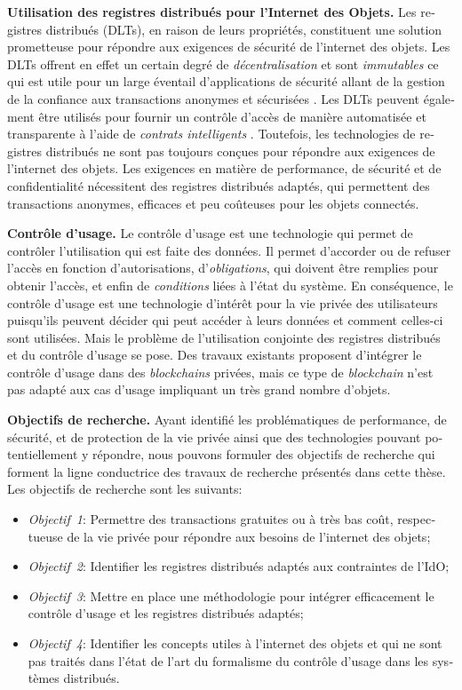 \begin{otherlanguage}{french}
\textbf{Utilisation des registres distribués pour l'Internet des Objets.} Les registres distribués (DLTs), en raison de leurs propriétés, constituent une solution prometteuse pour répondre aux exigences de sécurité de l'internet des objets. Les DLTs offrent en effet un certain degré de \emph{décentralisation} et sont \emph{immutables} ce qui est utile pour un large éventail d'applications de sécurité allant de la gestion de la confiance \cite{Liu2023} aux transactions anonymes et sécurisées \cite{Bothra2023}. Les DLTs peuvent également être utilisés pour fournir un contrôle d'accès de manière automatisée et transparente à l'aide de \emph{contrats intelligents} \cite{Bao2023}. Toutefois, les technologies de registres distribués ne sont pas toujours conçues pour répondre aux exigences de l'internet des objets. Les exigences en matière de performance, de sécurité et de confidentialité nécessitent des registres distribués adaptés, qui permettent des transactions anonymes, efficaces et peu coûteuses pour les objets connectés.

\textbf{Contrôle d'usage.} Le contrôle d'usage est une technologie qui permet de contrôler l'utilisation qui est faite des données. Il permet d'accorder ou de refuser l'accès en fonction d'autorisations, d'\emph{obligations}, qui doivent être remplies pour obtenir l'accès, et enfin de \emph{conditions} liées à l'état du système. En conséquence, le contrôle d'usage est une technologie d'intérêt pour la vie privée des utilisateurs puisqu'ils peuvent décider qui peut accéder à leurs données et comment celles-ci sont utilisées. Mais le problème de l’utilisation conjointe des registres distribués et du contrôle d’usage se pose. Des travaux existants proposent d'intégrer le contrôle d'usage dans des \emph{blockchains} privées, mais ce type de \emph{blockchain} n'est pas adapté aux cas d'usage impliquant un très grand nombre d'objets.

\textbf{Objectifs de recherche.} Ayant identifié les problématiques de performance, de sécurité, et de protection de la vie privée ainsi que des technologies pouvant potentiellement y répondre, nous pouvons formuler des objectifs de recherche qui forment la ligne conductrice des travaux de recherche présentés dans cette thèse. Les objectifs de recherche sont les suivants:

\begin{itemize}
    \item \emph{Objectif~1}: Permettre des transactions gratuites ou à très bas coût, respectueuse de la vie privée pour répondre aux besoins de l'internet des objets;
    \item \emph{Objectif~2}: Identifier les registres distribués adaptés aux contraintes de l'IdO;
    \item \emph{Objectif~3}: Mettre en place une méthodologie pour intégrer efficacement le contrôle d'usage et les registres distribués adaptés;
    \item \emph{Objectif~4}: Identifier les concepts utiles à l'internet des objets et qui ne sont pas traités dans l'état de l'art du formalisme du contrôle d'usage dans les systèmes distribués.
\end{itemize}


\end{otherlanguage}
